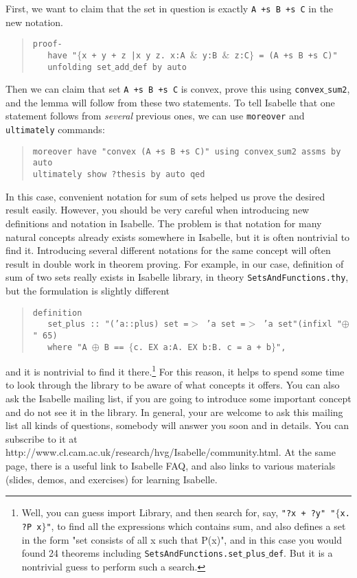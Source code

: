 \documentclass[11pt]{article}
\newcommand{\inds}{\phantom{a}\,\,\,}
\newcommand{\prog}[1]{\par\noindent\begin{quote}#1\end{quote}\par\noindent}
\begin{document}
First, we want to claim that the set in question is exactly {\tt A +s B +s C} in the new notation.

\prog{\tt proof-\\
    \inds have "$\{$x + y + z |x y z.~x:A $\&$ y:B $\&$ z:C$\}$ = (A +s B +s C)"\\
    \inds unfolding set$\_$add$\_$def by auto}%

Then we can claim that set  {\tt A +s B +s C} is convex, prove this using {\tt convex$\_$sum2}, and the lemma will follow from these two statements. To tell Isabelle that one statement follows from \emph{several} previous ones, we can use {\tt moreover} and {\tt ultimately} commands:

\prog{\tt moreover have "convex (A +s B +s C)"
    using convex$\_$sum2 assms by auto\\
    ultimately show ?thesis by auto qed}%

In this case, convenient notation for sum of sets helped us prove the desired result easily. However, you should be very careful when introducing new definitions and notation in Isabelle. The problem is that notation for many natural concepts already exists somewhere in Isabelle, but it is often nontrivial to find it. Introducing several different notations for the same concept will often result in double work in theorem proving.
For example, in our case, definition of sum of two sets really exists in Isabelle library, in theory {\tt SetsAndFunctions.thy}, but the formulation is slightly different

\prog{\tt definition\\
    \inds set$\_$plus :: "('a::plus) set =$>$ 'a set =$>$ 'a set"(infixl "$\oplus$" 65)\\
    \inds where "A $\oplus$ B == $\{$c. EX a:A. EX b:B. c = a + b$\}$",}%
and it is nontrivial to find it there.\footnote{Well, you can guess import Library, and then search for, say, {\tt "?x + ?y" "$\{$x. ?P x$\}$"}, to find all the expressions which contains sum, and also defines a set in the form "set consists of all x such that P(x)", and in this case you would found 24 theorems including {\tt SetsAndFunctions.set$\_$plus$\_$def}. But it is a nontrivial guess to perform such a search.} For this reason, it helps to spend some time to look through the library to be aware of what concepts it offers.
You can also ask the Isabelle mailing list, if you are going to introduce some important concept and do not see it in the library. In general, your are welcome to ask this mailing list all kinds of questions, somebody will answer you soon and in details. You can subscribe to it at http://www.cl.cam.ac.uk/research/hvg/Isabelle/community.html. At the same page, there is a useful link to Isabelle FAQ, and also links to various materials (slides, demos, and exercises) for learning Isabelle.
\end{document}
